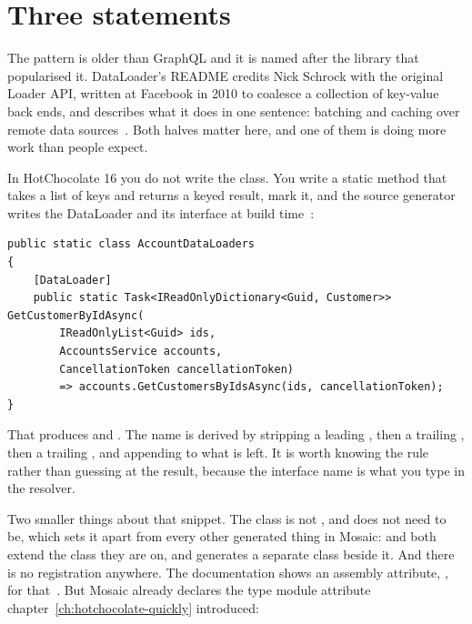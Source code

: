 \section{Three statements}
\label{sec:ch04-three-statements}

The pattern is older than GraphQL and it is named after the library that
popularised it. DataLoader's README credits Nick Schrock with the original
Loader API, written at Facebook in 2010 to coalesce a collection of key-value
back ends, and describes what it does in one sentence: batching and caching over
remote data sources~\autocite{schrock2026dataloader}. Both halves matter here,
and one of them is doing more work than people expect.

%
In HotChocolate 16 you do not write the class. You write a static method that
takes a list of keys and returns a keyed result, mark it, and the source
generator writes the DataLoader and its interface at build
time~\autocite{chillicream2026dataloaderdocs}:

\begin{verbatim}
public static class AccountDataLoaders
{
    [DataLoader]
    public static Task<IReadOnlyDictionary<Guid, Customer>> GetCustomerByIdAsync(
        IReadOnlyList<Guid> ids,
        AccountsService accounts,
        CancellationToken cancellationToken)
        => accounts.GetCustomersByIdsAsync(ids, cancellationToken);
}
\end{verbatim}

That produces  and .
The name is derived by stripping a leading , then a trailing
, then a trailing , and appending 
to what is left. It is worth knowing the rule rather than guessing at the result,
because the interface name is what you type in the resolver.

%
Two smaller things about that snippet. The class is not , and does
not need to be, which sets it apart from every other generated thing in Mosaic:
\code{[QueryType]} and \code{[ObjectType<T>]} both extend the class they are on,
and \code{[DataLoader]} generates a separate class beside it. And there is no
registration anywhere. The documentation shows an assembly attribute,
, for that~\autocite{chillicream2026dataloaderdocs}. But
Mosaic already declares the type module attribute
chapter~\ref{ch:hotchocolate-quickly} introduced:

